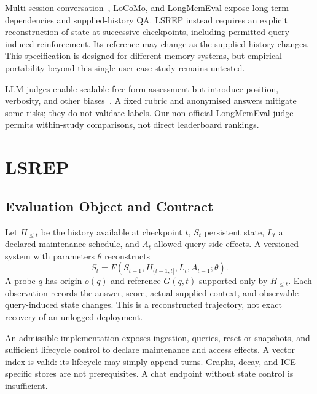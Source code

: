 \documentclass[11pt]{article}
\begin{document}
Multi-session conversation~\citep{xu2022msc}, LoCoMo, and LongMemEval expose long-term dependencies and supplied-history QA. LSREP instead requires an explicit reconstruction of state at successive checkpoints, including permitted query-induced reinforcement. Its reference may change as the supplied history changes. This specification is designed for different memory systems, but empirical portability beyond this single-user case study remains untested.

LLM judges enable scalable free-form assessment but introduce position, verbosity, and other biases~\citep{zheng2023judging,liu2023geval,wang2024unfair}. A fixed rubric and anonymised answers mitigate some risks; they do not validate labels. Our non-official LongMemEval judge permits within-study comparisons, not direct leaderboard rankings.

\section{LSREP}
\subsection{Evaluation Object and Contract}
Let $H_{\leq t}$ be the history available at checkpoint $t$, $S_t$ persistent state, $L_t$ a declared maintenance schedule, and $A_t$ allowed query side effects. A versioned system with parameters $\theta$ reconstructs
\begin{equation}
 S_t=F(S_{t-1},H_{(t-1,t]},L_t,A_{t-1};\theta).
\end{equation}
A probe $q$ has origin $o(q)$ and reference $G(q,t)$ supported only by $H_{\leq t}$. Each observation records the answer, score, actual supplied context, and observable query-induced state changes. This is a reconstructed trajectory, not exact recovery of an unlogged deployment.

An admissible implementation exposes ingestion, queries, reset or snapshots, and sufficient lifecycle control to declare maintenance and access effects. A vector index is valid: its lifecycle may simply append turns. Graphs, decay, and ICE-specific stores are not prerequisites. A chat endpoint without state control is insufficient.
\end{document}
